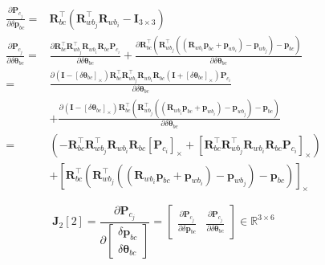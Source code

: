 \documentclass[12pt]{report}   %
\begin{document}
\begin{enumerate}
	\begin{equation}
	\begin{aligned}
	\frac{\partial \mathbf{P}_{c_{j}}}{\partial \delta \mathbf{p}_{bc}} 
	={}& 
	\mathbf{R}_{b c}^{\top}\left(\mathbf{R}_{w b_{j}}^{\top} \mathbf{R}_{w b_{i}}-\mathbf{I}_{3 \times 3}\right) 
	\\
	\frac{\partial \mathbf{P}_{c_{j}}}{\partial \delta \boldsymbol{\theta}_{bc}} 
	={}&
	\frac{\partial 
		\mathbf{R}_{b c}^{\top} 
		\mathbf{R}_{w b_{j}}^{\top} 
		\mathbf{R}_{w b_{i}} 
		\mathbf{R}_{b c} 
		\mathbf{P}_{c_i}}
	{\partial \delta \boldsymbol{\theta}_{bc}} 
	+
	\frac{\partial 
		\mathbf{R}_{b c}^{\top}
		\left(\mathbf{R}_{w b_{j}}^{\top} 
		\left(\left(\mathbf{R}_{w b_{i}} \mathbf{p}_{b c}+\mathbf{p}_{w b_{i}}\right)
		-\mathbf{p}_{w b_{j}}\right)-\mathbf{p}_{b c}\right)}
	{\partial \delta \boldsymbol{\theta}_{bc}} \\
	={}&
	\frac{\partial 
		\left(\mathbf{I}-\left[\delta \boldsymbol{\theta}_{bc}\right]_{\times}\right)
		\mathbf{R}_{b c}^{\top} 
		\mathbf{R}_{w b_{j}}^{\top} 
		\mathbf{R}_{w b_{i}} 
		\mathbf{R}_{b c} 
		\left(\mathbf{I}+\left[\delta \boldsymbol{\theta}_{bc}\right]_{\times}\right)
		\mathbf{P}_{c_i}}
	{\partial \delta \boldsymbol{\theta}_{bc}} \\
	&+
	\frac{\partial 
		\left(\mathbf{I}-\left[\delta \boldsymbol{\theta}_{bc}\right]_{\times}\right)
		\mathbf{R}_{b c}^{\top}
		\left(\mathbf{R}_{w b_{j}}^{\top} 
		\left(\left(\mathbf{R}_{w b_{i}} \mathbf{p}_{b c}+\mathbf{p}_{w b_{i}}\right)
		-\mathbf{p}_{w b_{j}}\right)-\mathbf{p}_{b c}\right)}
	{\partial \delta \boldsymbol{\theta}_{bc}} \\
	={}&
	\left(-\mathbf{R}_{b c}^{\top} \mathbf{R}_{w b_{j}}^{\top} \mathbf{R}_{w b_{i}} \mathbf{R}_{b c}\left[\mathbf{P}_{c_{i}}\right]_{\times} + \left[\mathbf{R}_{b c}^{\top} \mathbf{R}_{w b_{j}}^{\top} \mathbf{R}_{w b_{i}} \mathbf{R}_{b c} \mathbf{P}_{c_{i}}\right]_{\times}\right) \\
	&+
	\left[\mathbf{R}_{b c}^{\top}\left(\mathbf{R}_{w b_{j}}^{\top}\left(\left(\mathbf{R}_{w b_{i}} \mathbf{p}_{b c}+\mathbf{p}_{w b_{i}}\right)-\mathbf{p}_{w b_{j}}\right)-\mathbf{p}_{b c}\right)\right]_{\times}
	\end{aligned}
	\end{equation}
	
	\begin{equation}
	\mathbf{J}_2[2] =
	\frac{\partial \mathbf{P}_{c_{j}}}
	{\partial\left[\begin{array}{c}{\delta \mathbf{p}_{bc}} \\ 
		{\delta \boldsymbol{\theta}_{bc}}\end{array}\right]} =
	\begin{bmatrix}
	\frac{\partial \mathbf{P}_{c_{j}}}{\partial \delta \mathbf{p}_{bc}} &
	\frac{\partial \mathbf{P}_{c_{j}}}{\partial \delta \boldsymbol{\theta}_{bc}} 
	\end{bmatrix}
	\in \mathbb{R}^{3 \times 6}
	\end{equation}
	

\end{enumerate}
\end{document}
